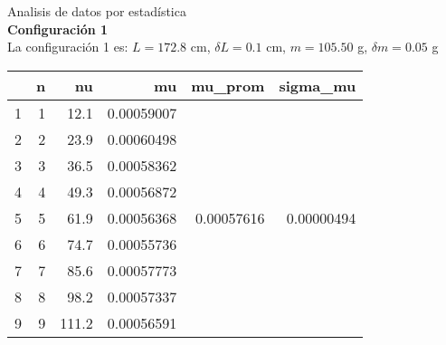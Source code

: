 \documentclass{article}
\begin{document}


Analisis de datos por estadística\\
\textbf{Configuración 1}\\
La configuración 1 es: $L=172.8$ cm, $\delta L = 0.1$ cm, $m=105.50$ g, $\delta m = 0.05$ g
\begin{table}[ht]
\centering
\begin{tabular}{rrrrrr}
  \hline
 & n & nu & mu & mu\_prom & sigma\_mu \\ 
  \hline
1 & 1 & 12.1 & 0.00059007 &  &  \\ 
  2 & 2 & 23.9 & 0.00060498 &  &  \\ 
  3 & 3 & 36.5 & 0.00058362 &  &  \\ 
  4 & 4 & 49.3 & 0.00056872 &  &  \\ 
  5 & 5 & 61.9 & 0.00056368 & 0.00057616 & 0.00000494 \\ 
  6 & 6 & 74.7 & 0.00055736 &  &  \\ 
  7 & 7 & 85.6 & 0.00057773 &  &  \\ 
  8 & 8 & 98.2 & 0.00057337 &  &  \\ 
  9 & 9 & 111.2 & 0.00056591 &  &  \\ 
   \hline
\end{tabular}
\end{table}
\end{document}
